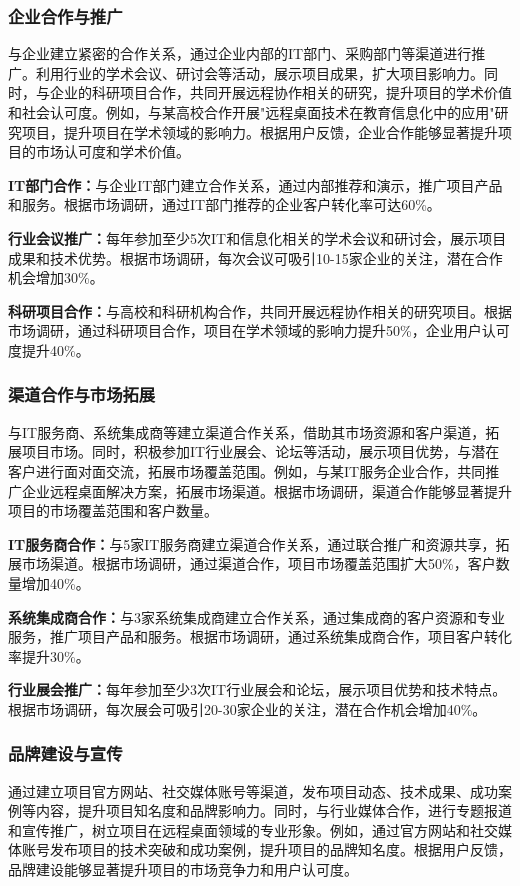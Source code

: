 \documentclass[12pt,a4paper]{article}
\begin{document}
\subsubsection{企业合作与推广}
与企业建立紧密的合作关系，通过企业内部的IT部门、采购部门等渠道进行推广。利用行业的学术会议、研讨会等活动，展示项目成果，扩大项目影响力。同时，与企业的科研项目合作，共同开展远程协作相关的研究，提升项目的学术价值和社会认可度。例如，与某高校合作开展"远程桌面技术在教育信息化中的应用"研究项目，提升项目在学术领域的影响力。根据用户反馈，企业合作能够显著提升项目的市场认可度和学术价值。

\textbf{IT部门合作：}与企业IT部门建立合作关系，通过内部推荐和演示，推广项目产品和服务。根据市场调研，通过IT部门推荐的企业客户转化率可达60\%。

\textbf{行业会议推广：}每年参加至少5次IT和信息化相关的学术会议和研讨会，展示项目成果和技术优势。根据市场调研，每次会议可吸引10-15家企业的关注，潜在合作机会增加30\%。

\textbf{科研项目合作：}与高校和科研机构合作，共同开展远程协作相关的研究项目。根据市场调研，通过科研项目合作，项目在学术领域的影响力提升50\%，企业用户认可度提升40\%。

\subsubsection{渠道合作与市场拓展}
与IT服务商、系统集成商等建立渠道合作关系，借助其市场资源和客户渠道，拓展项目市场。同时，积极参加IT行业展会、论坛等活动，展示项目优势，与潜在客户进行面对面交流，拓展市场覆盖范围。例如，与某IT服务企业合作，共同推广企业远程桌面解决方案，拓展市场渠道。根据市场调研，渠道合作能够显著提升项目的市场覆盖范围和客户数量。

\textbf{IT服务商合作：}与5家IT服务商建立渠道合作关系，通过联合推广和资源共享，拓展市场渠道。根据市场调研，通过渠道合作，项目市场覆盖范围扩大50\%，客户数量增加40\%。

\textbf{系统集成商合作：}与3家系统集成商建立合作关系，通过集成商的客户资源和专业服务，推广项目产品和服务。根据市场调研，通过系统集成商合作，项目客户转化率提升30\%。

\textbf{行业展会推广：}每年参加至少3次IT行业展会和论坛，展示项目优势和技术特点。根据市场调研，每次展会可吸引20-30家企业的关注，潜在合作机会增加40\%。

\subsubsection{品牌建设与宣传}
通过建立项目官方网站、社交媒体账号等渠道，发布项目动态、技术成果、成功案例等内容，提升项目知名度和品牌影响力。同时，与行业媒体合作，进行专题报道和宣传推广，树立项目在远程桌面领域的专业形象。例如，通过官方网站和社交媒体账号发布项目的技术突破和成功案例，提升项目的品牌知名度。根据用户反馈，品牌建设能够显著提升项目的市场竞争力和用户认可度。
\end{document}
